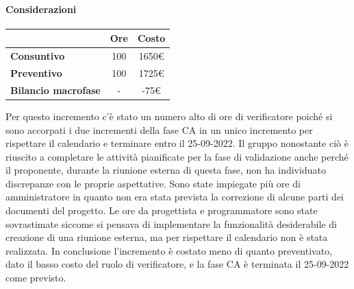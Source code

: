\paragraph{Considerazioni} \hfill \break
\begin{center}
	\renewcommand{\arraystretch}{1.8}
	\begin{tabular}{ | l |c|c| }
    \hline
    & \textbf{Ore} & \textbf{Costo} \\
	\hline
    \textbf{Consuntivo} & 100 & 1650\euro \\
    \hline
    \textbf{Preventivo} & 100 & 1725\euro \\
    \hline
    \textbf{Bilancio macrofase} & - & -75\euro \\
    \hline
    \end{tabular}
\end{center}
Per questo incremento c'è stato un numero alto di ore di verificatore poiché si sono accorpati i due incrementi della fase CA in un unico incremento per rispettare il calendario e terminare
entro il 25-09-2022. Il gruppo nonostante ciò è riuscito a completare le attività pianificate per la fase di validazione anche perché il proponente, durante la riunione
esterna di questa fase, non ha individuato discrepanze con le proprie aspettative. Sono state impiegate più ore di amministratore in quanto non era stata prevista la correzione di alcune parti dei documenti del progetto.
Le ore da progettista e programmatore sono state sovrastimate siccome si pensava di implementare la funzionalità desiderabile di creazione di una riunione esterna, ma per rispettare il calendario non è stata realizzata. 
In conclusione l'incremento è costato meno di quanto preventivato, dato il basso costo del ruolo di verificatore, e la fase CA è terminata il 25-09-2022 come previsto.